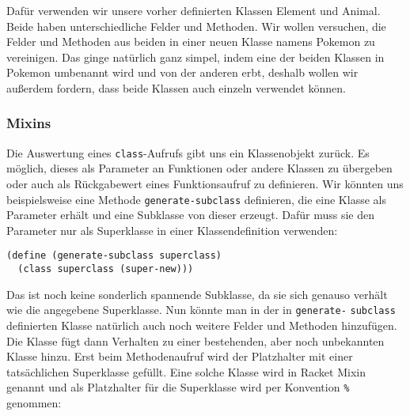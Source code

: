 Dafür verwenden wir unsere vorher definierten Klassen Element und Animal. Beide haben unterschiedliche Felder und Methoden. Wir wollen versuchen, die Felder und Methoden aus beiden in einer neuen Klasse namens Pokemon zu vereinigen. %
Das ginge natürlich ganz simpel, indem eine der beiden Klassen in Pokemon umbenannt wird und von der anderen erbt, deshalb wollen wir außerdem fordern, dass beide Klassen auch einzeln verwendet können. 



\subsubsection{Mixins}
Die Auswertung eines \texttt{class}-Aufrufs gibt uns ein Klassenobjekt zurück. Es möglich, dieses als Parameter an Funktionen oder andere Klassen zu übergeben oder auch als Rückgabewert eines Funktionsaufruf zu definieren. Wir könnten uns beispielsweise eine Methode \texttt{generate-subclass} definieren, die eine Klasse als Parameter erhält und eine Subklasse von dieser erzeugt. Dafür muss sie den Parameter nur als Superklasse in einer Klassendefinition verwenden:

\begin{lstlisting}
(define (generate-subclass superclass)
  (class superclass (super-new)))
\end{lstlisting} 

Das ist noch keine sonderlich spannende Subklasse, da sie sich genauso verhält wie die angegebene Superklasse.
% 
% 
% 
% 
% 
Nun könnte man in der in \texttt{generate-} \texttt{subclass} definierten Klasse natürlich auch noch weitere Felder und Methoden hinzufügen. Die Klasse fügt dann Verhalten zu einer bestehenden, aber noch unbekannten Klasse hinzu. Erst beim Methodenaufruf wird der Platzhalter mit einer tatsächlichen Superklasse gefüllt. Eine solche Klasse wird in Racket Mixin genannt und als Platzhalter für die Superklasse wird per Konvention \texttt{\%} genommen:

